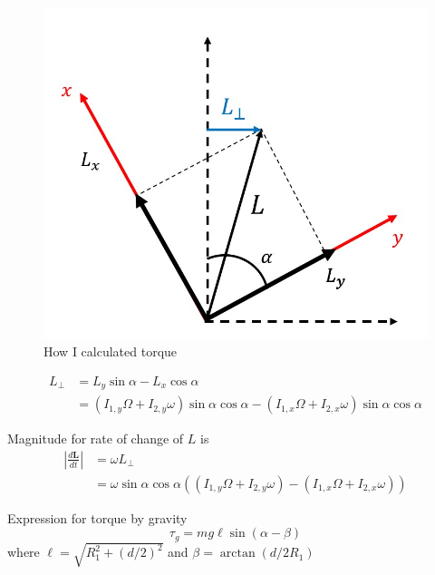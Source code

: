 \documentclass{scrartcl}
\begin{document}
\begin{figure}[h]
    \centering
    \includegraphics[scale=0.5]{diagram3.jpg}
    \caption{How I calculated torque}
    \label{3}
\end{figure}

\begin{equation}
    \begin{aligned}
        L_\perp & = L_y \sin\alpha- L_x \cos\alpha                                                                        \\
                & = (I_{1,y}\Omega +I_{2,y}\omega)\sin\alpha\cos\alpha-(I_{1,x}\Omega +I_{2,x}\omega)\sin\alpha\cos\alpha
    \end{aligned}
\end{equation}

Magnitude for rate of change of $L$ is
\begin{equation}
    \begin{aligned}
        \left|\frac{d\mathbf{L}}{dt} \right| & =\omega L_\perp                                                                              \\
                                             & = \omega\sin\alpha\cos\alpha ((I_{1,y}\Omega +I_{2,y}\omega)-(I_{1,x}\Omega +I_{2,x}\omega))
    \end{aligned}
\end{equation}

Expression for torque by gravity
\begin{equation}
    \tau_g = mg \ell\sin(\alpha-\beta)
\end{equation}
where $\ell=\sqrt{R_1^2+(d/2)^2}$ and $\beta=\arctan(d/2R_1)$
\end{document}

